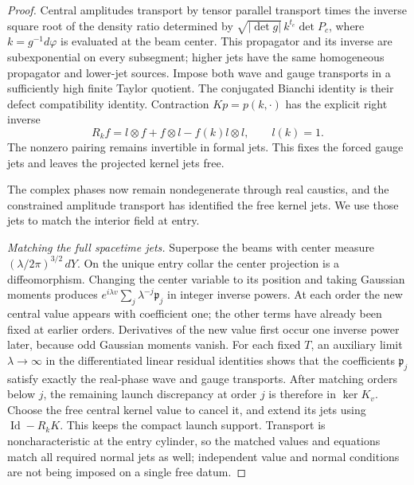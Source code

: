 \begin{proof}
Central amplitudes transport by tensor parallel transport times
the inverse square root of the density ratio determined by
$\sqrt{|\det g|}\,k^{t_e}\det P_c$, where $k=g^{-1}d\varphi$
is evaluated at the beam center. This propagator and its
inverse are subexponential on every subsegment; higher jets have
the same homogeneous propagator and lower-jet sources.  Impose
both wave and gauge transports in a sufficiently high finite
Taylor quotient.  The conjugated Bianchi identity is their defect
compatibility identity.  Contraction $Kp=p(k,\cdot)$ has the
explicit right inverse
\begin{equation}\label{bg:contraction-inverse}
 R_kf=l\otimes f+f\otimes l-f(k)l\otimes l,
                         \qquad l(k)=1.
\end{equation}
The nonzero pairing remains invertible in formal jets.  This
fixes the forced gauge jets and leaves the projected kernel jets
free.

The complex phases now remain nondegenerate through real caustics,
and the constrained amplitude transport has identified the free kernel
jets. We use those jets to match the interior field at entry.

\emph{Matching the full spacetime jets.}
Superpose the beams with center measure
$(\lambda/2\pi)^{3/2}\,dY$.  On the unique entry collar the
center projection is a diffeomorphism.  Changing the center
variable to its position and taking Gaussian moments produces
$e^{i\lambda v}\sum_j\lambda^{-j}\mathfrak p_j$ in integer
inverse powers.  At each order the new central value appears
with coefficient one; the other terms have already been fixed
at earlier orders.  Derivatives of the new value first occur
one inverse power later, because odd Gaussian moments vanish.
For each fixed $T$, an auxiliary limit $\lambda\to\infty$ in
the differentiated linear residual identities shows that the
coefficients $\mathfrak p_j$ satisfy exactly the real-phase wave
and gauge transports.  After matching orders below $j$, the
remaining launch discrepancy at order $j$ is therefore in
$\ker K_v$.  Choose the free central kernel value to cancel it,
and extend its jets using $\operatorname{Id}-R_kK$.  This keeps
the compact launch support.  Transport is noncharacteristic at
the entry cylinder, so the matched values and equations match
all required normal jets as well; independent value and normal
conditions are not being imposed on a single free datum.


\end{proof}
